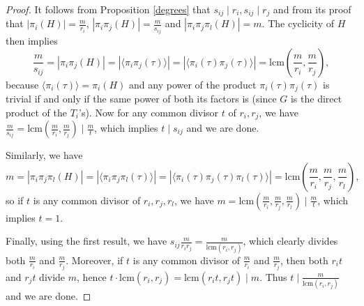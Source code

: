 \documentclass[12pt,a4paper]{article}
\newcommand{\lcm}{\mathrm{lcm}}
\begin{document}
\begin{proof}
It follows from Proposition \ref{degrees} that $s_{ij}\mid r_i, s_{ij}\mid r_j$ and from its proof that $|\pi_i(H)|=\frac{m}{r_i}$, $|\pi_i\pi_j(H)|=\frac{m}{s_{ij}}$ and $|\pi_i\pi_j\pi_l(H)|=m$. The cyclicity of $H$ then implies
$$\frac{m}{s_{ij}}=|\pi_i\pi_j(H)|=|\langle\pi_i\pi_j(\tau)\rangle|=|\langle\pi_i(\tau)\pi_j(\tau)\rangle|=\lcm\left(\frac{m}{r_i},\frac{m}{r_j}\right),$$
because $\langle\pi_i(\tau)\rangle=\pi_i(H)$ and any power of the product $\pi_i(\tau)\pi_j(\tau)$ is trivial if and only if the same power of both its factors is (since $G$ is the direct product of the $T_i$'s). 
Now for any common divisor $t$ of $r_i,r_j$, we have $\frac{m}{s_{ij}}= \lcm\left(\frac{m}{r_i},\frac{m}{r_j}\right) \mid \frac{m}{t}$, which implies $t\mid s_{ij}$ and we are done.

Similarly, we have
$$m=|\pi_i\pi_j\pi_l(H)|=|\langle\pi_i\pi_j\pi_l(\tau)\rangle|=|\langle\pi_i(\tau)\pi_j(\tau)\pi_l(\tau)\rangle|=\lcm\left(\frac{m}{r_i},\frac{m}{r_j},\frac{m}{r_l}\right),$$
so if $t$ is any common divisor of $r_i,r_j,r_l$, we have $m=\lcm\left(\frac{m}{r_i},\frac{m}{r_j},\frac{m}{r_l}\right)\mid \frac{m}{t}$, which implies $t=1$.

Finally, using the first result, we have $s_{ij}\frac{m}{r_ir_j}=\frac{m}{\lcm(r_i,r_j)}$, which clearly divides both $\frac{m}{r_i}$ and $\frac{m}{r_j}$. Moreover, if $t$ is any common divisor of $\frac{m}{r_i}$ and $\frac{m}{r_j}$, then both $r_it$ and $r_jt$ divide $m$, hence $t\cdot\lcm(r_i,r_j)=\lcm(r_it,r_jt)\mid m$. Thus $t\mid \frac{m}{\lcm(r_i,r_j)}$ and we are done.
\end{proof}
\end{document}

